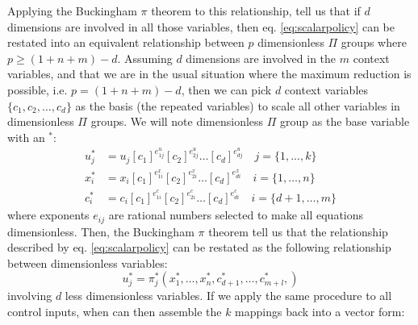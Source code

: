 Applying the Buckingham $\pi$ theorem to this relationship, tell us that if $d$ dimensions are involved in all those variables, then eq. \eqref{eq:scalarpolicy} can be restated into an equivalent relationship between $p$ dimensionless $\Pi$ groups where $p \geq (1 + n + m ) - d$. Assuming $d$ dimensions are involved in the $m$ context variables, and that we are in the usual situation where the maximum reduction is possible, i.e. $p = (1 + n + m ) - d$, then we can pick $d$ context variables $\{c_1, c_2 , \hdots,c_d\}$ as the basis (the repeated variables) to scale all other variables in dimensionless $\Pi$ groups. We will note dimensionless $\Pi$ group as the base variable with an ${}^*$:
\begin{align}
u_j^* &= u_j \left[ c_1 \right]^{e^u_{1j}} \left[ c_2 \right]^{e^u_{2j}} \hdots \left[ c_d \right]^{e^u_{dj}} \quad \scriptstyle j = \{ 1, \hdots , k \} \label{eq:piu}\\
x_i^* &= x_i \left[ c_1 \right]^{e^x_{1i}} \left[ c_2 \right]^{e^x_{2i}} \hdots \left[ c_d \right]^{e^x_{di}} \quad \scriptstyle i = \{ 1, \hdots , n \} \label{eq:pix}\\
c_i^* &= c_i\left[ c_1 \right]^{e^c_{1i}} \left[ c_2 \right]^{e^c_{2i}} \hdots \left[ c_d \right]^{e^c_{di}} \quad \scriptstyle i = \{ d+1, \hdots , m \} \label{eq:pic}%
\end{align}
where exponents $e_{ij}$ are rational numbers selected to make all equations dimensionless. Then, the Buckingham $\pi$ theorem tell us that the relationship described by eq. \eqref{eq:scalarpolicy} can be restated as the following relationship between  dimensionless variables:
\begin{equation}
u_j^* = \pi_j^* \left(
x_1^*, \hdots, x_n^*, 
c_{d+1}^*, \hdots, c_{m+l}^*, 
\right) 
\label{eq:scalardimpolicy}
\end{equation}
involving $d$ less dimensionless variables. If we apply the same procedure to all control inputs, when can then assemble the $k$ mappings back into a vector form:
